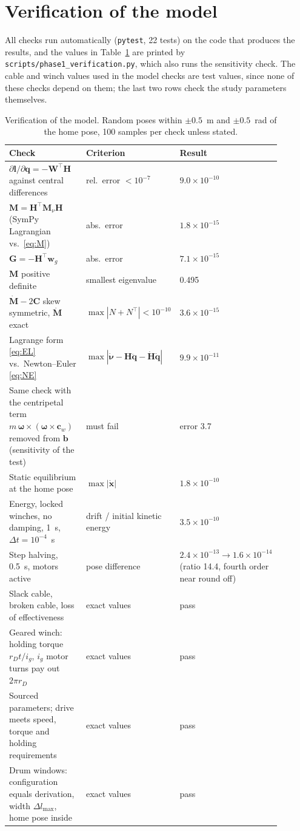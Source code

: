 \documentclass[10pt]{article}
\newcommand{\vc}[1]{\bm{#1}}
\newcommand{\mt}[1]{\mathbf{#1}}
\begin{document}
\section{Verification of the model}\label{app:verification}

All checks run automatically (\texttt{pytest}, 22 tests) on the code that produces the results, and the values in Table~\ref{tab:verification} are printed by \texttt{scripts/phase1\_verification.py}, which also runs the sensitivity check. The cable and winch values used in the model checks are test values, since none of these checks depend on them; the last two rows check the study parameters themselves.

\begin{table}[h]
\centering
\caption{Verification of the model. Random poses within $\pm0.5$~m and $\pm0.5$~rad of the home pose, 100 samples per check unless stated.}\label{tab:verification}
\begin{tabular}{@{}p{0.47\linewidth}p{0.2\linewidth}p{0.22\linewidth}@{}}
\toprule
Check & Criterion & Result\\
\midrule
$\partial\vc l/\partial\vc q=-\mt W^\top\mt H$ against central differences & rel.\ error $<10^{-7}$ & $9.0\times10^{-10}$\\
$\mt M=\mt H^\top\mt M_\nu\mt H$ (SymPy Lagrangian vs.\ \eqref{eq:M}) & abs.\ error & $1.8\times10^{-15}$\\
$\vc G=-\mt H^\top\vc w_g$ & abs.\ error & $7.1\times10^{-15}$\\
$\mt M$ positive definite & smallest eigenvalue & 0.495\\
$\dot{\mt M}-2\mt C$ skew symmetric, $\dot{\mt M}$ exact & $\max|N+N^\top|<10^{-10}$ & $3.6\times10^{-15}$\\
Lagrange form \eqref{eq:EL} vs.\ Newton--Euler \eqref{eq:NE} & $\max|\dot{\vc\nu}-\mt H\ddot{\vc q}-\dot{\mt H}\dot{\vc q}|$ & $9.9\times10^{-11}$\\
Same check with the centripetal term $m\,\vc\omega\times(\vc\omega\times\vc c_w)$ removed from $\vc b$ (sensitivity of the test) & must fail & error 3.7\\
Static equilibrium at the home pose & $\max|\dot{\vc x}|$ & $1.8\times10^{-10}$\\
Energy, locked winches, no damping, 1~s, $\Delta t=10^{-4}$~s & drift / initial kinetic energy & $3.5\times10^{-10}$\\
Step halving, 0.5~s, motors active & pose difference & $2.4\times10^{-13}\to1.6\times10^{-14}$ (ratio 14.4, fourth order near round off)\\
Slack cable, broken cable, loss of effectiveness & exact values & pass\\
Geared winch: holding torque $r_D t/i_g$, $i_g$ motor turns pay out $2\pi r_D$ & exact values & pass\\
Sourced parameters; drive meets speed, torque and holding requirements & exact values & pass\\
Drum windows: configuration equals derivation, width $\Delta l_{\max}$, home pose inside & exact values & pass\\
\bottomrule
\end{tabular}
\end{table}
\end{document}
